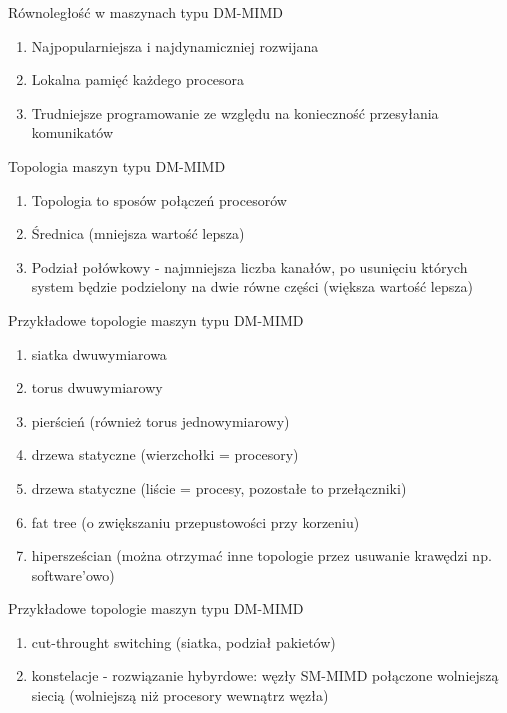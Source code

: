 \documentclass{beamer}
\begin{document}
\begin{frame}{Równoległość w maszynach typu DM-MIMD}
  \begin{enumerate}
  \item Najpopularniejsza i najdynamiczniej rozwijana
  \item Lokalna pamięć każdego procesora
  \item Trudniejsze programowanie ze względu na konieczność przesyłania komunikatów
  \end{enumerate}
\end{frame}

\begin{frame}{Topologia maszyn typu DM-MIMD}
  \begin{enumerate}
  \item Topologia to sposów połączeń procesorów
  \item Średnica (mniejsza wartość lepsza)
  \item Podział połówkowy - najmniejsza liczba kanałów, po usunięciu których system będzie podzielony na dwie równe części (większa wartość lepsza)
  \end{enumerate}
\end{frame}

\begin{frame}{Przykładowe topologie maszyn typu DM-MIMD}
  \begin{enumerate}
  \item siatka dwuwymiarowa
  \item torus dwuwymiarowy
  \item pierścień (również torus jednowymiarowy)
  \item drzewa statyczne (wierzchołki = procesory)
  \item drzewa statyczne (liście = procesy, pozostałe to przełączniki)
  \item fat tree (o zwiększaniu przepustowości przy korzeniu)
  \item hipersześcian (można otrzymać inne topologie przez usuwanie krawędzi np. software'owo)
  \end{enumerate}
\end{frame}

\begin{frame}{Przykładowe topologie maszyn typu DM-MIMD}
  \begin{enumerate}
  \item cut-throught switching (siatka, podział pakietów)
  \item konstelacje - rozwiązanie hybyrdowe: węzły SM-MIMD połączone wolniejszą siecią (wolniejszą niż procesory wewnątrz węzła)
  \end{enumerate}
\end{frame}
\end{document}
